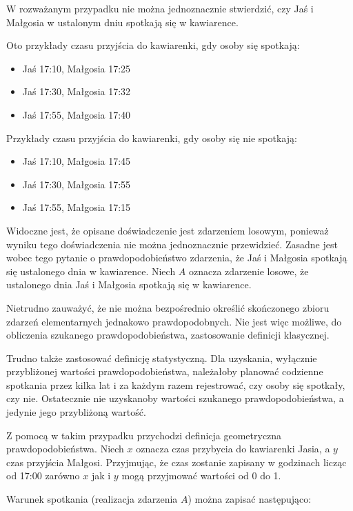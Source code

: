 \documentclass[
  letterpaper,
  DIV=11,
  numbers=noendperiod]{scrreprt}
\providecommand{\tightlist}{%
  \setlength{\itemsep}{0pt}\setlength{\parskip}{0pt}}\usepackage{longtable,booktabs,array}
\begin{document}
W rozważanym przypadku nie można jednoznacznie stwierdzić, czy Jaś i
Małgosia w ustalonym dniu spotkają się w kawiarence.

Oto przykłady czasu przyjścia do kawiarenki, gdy osoby się spotkają:

\begin{itemize}
\tightlist
\item
  Jaś 17:10, Małgosia 17:25
\item
  Jaś 17:30, Małgosia 17:32
\item
  Jaś 17:55, Małgosia 17:40
\end{itemize}

Przykłady czasu przyjścia do kawiarenki, gdy osoby się nie spotkają:

\begin{itemize}
\tightlist
\item
  Jaś 17:10, Małgosia 17:45
\item
  Jaś 17:30, Małgosia 17:55
\item
  Jaś 17:55, Małgosia 17:15
\end{itemize}

Widoczne jest, że opisane doświadczenie jest zdarzeniem losowym,
ponieważ wyniku tego doświadczenia nie można jednoznacznie przewidzieć.
Zasadne jest wobec tego pytanie o prawdopodobieństwo zdarzenia, że Jaś i
Małgosia spotkają się ustalonego dnia w kawiarence. Niech \(A\) oznacza
zdarzenie losowe, że ustalonego dnia Jaś i Małgosia spotkają się w
kawiarence.

Nietrudno zauważyć, że nie można bezpośrednio określić skończonego
zbioru zdarzeń elementarnych jednakowo prawdopodobnych. Nie jest więc
możliwe, do obliczenia szukanego prawdopodobieństwa, zastosowanie
definicji klasycznej.

Trudno także zastosować definicję statystyczną. Dla uzyskania, wyłącznie
przybliżonej wartości prawdopodobieństwa, należałoby planować codzienne
spotkania przez kilka lat i za każdym razem rejestrować, czy osoby się
spotkały, czy nie. Ostatecznie nie uzyskanoby wartości szukanego
prawdopodobieństwa, a jedynie jego przybliżoną wartość.

Z pomocą w takim przypadku przychodzi definicja geometryczna
prawdopodobieństwa. Niech \(x\) oznacza czas przybycia do kawiarenki
Jasia, a \(y\) czas przyjścia Małgosi. Przyjmując, że czas zostanie
zapisany w godzinach licząc od 17:00 zarówno \(x\) jak i \(y\) mogą
przyjmować wartości od 0 do 1.

Warunek spotkania (realizacja zdarzenia \(A\)) można zapisać
następująco:
\end{document}
